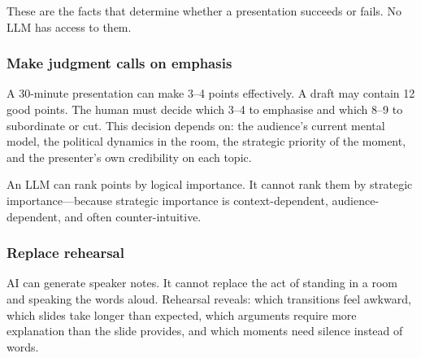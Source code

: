 These are the facts that determine whether a presentation succeeds or fails. No LLM has access to them.

\subsubsection{Make judgment calls on emphasis}

A 30-minute presentation can make 3--4 points effectively. A draft may contain 12 good points. The human must decide which 3--4 to emphasise and which 8--9 to subordinate or cut. This decision depends on: the audience's current mental model, the political dynamics in the room, the strategic priority of the moment, and the presenter's own credibility on each topic.

An LLM can rank points by logical importance. It cannot rank them by strategic importance---because strategic importance is context-dependent, audience-dependent, and often counter-intuitive.

\subsubsection{Replace rehearsal}

AI can generate speaker notes. It cannot replace the act of standing in a room and speaking the words aloud. Rehearsal reveals: which transitions feel awkward, which slides take longer than expected, which arguments require more explanation than the slide provides, and which moments need silence instead of words.

